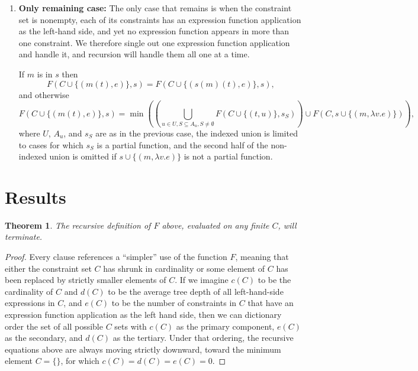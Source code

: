\documentclass{article}
\newtheorem{thm}{Theorem}
\begin{document}
\begin{enumerate}
        Let $U$ be the set of subexpressions of $e$, and for each $u\in U$, write $A_u$ to mean the set of addresses into $e$ at which $u$ appears.  Let $s_S$ be defined as in the previous case, but with $e$ instead of $e_1$.  Then
        \begin{multline*}
        	F(C\cup\{(m(t_1),e),(m(t_2),e)\},s) =	\\
                \min\left(\left(\bigcup_{u\in U,S\subseteq A_u,S\neq\emptyset}
                	F(C\cup\{(t_1,u),(t_2,u)\},s_S)\right)
                    	\cup F(C,s\cup\{(m,\lambda v.e)\})\right),
        \end{multline*}
        where the indexed union is limited to cases for which $s_S$ is a partial function, and the second half of the non-indexed union is omitted if $s\cup\{(m,\lambda v.e)\}$ is not a partial function.
\item	\label{case:otherwise}
		{\bf Only remaining case:}
		The only case that remains is when the constraint set is nonempty, each of its constraints has an expression function application as the left-hand side, and yet no expression function appears in more than one constraint.  We therefore single out one expression function application and handle it, and recursion will handle them all one at a time.
		
		If $m$ is in $s$ then
		$$	F(C\cup\{(m(t),e)\},s) = F(C\cup\{(s(m)(t),e)\},s),	$$
		and otherwise
		$$	F(C\cup\{(m(t),e)\},s) = 
				\min\left(\left(\bigcup_{u\in U,S\subseteq A_u,S\neq\emptyset}
					F(C\cup\{(t,u)\},s_S)\right)
						\cup F(C,s\cup\{(m,\lambda v.e)\})\right),	$$
		where $U$, $A_u$, and $s_S$ are as in the previous case, the indexed union is limited to cases for which $s_S$ is a partial function, and the second half of the non-indexed union is omitted if $s\cup\{(m,\lambda v.e)\}$ is not a partial function.
\end{enumerate}

\section{Results}%

\begin{thm}\label{T:terminates}
The recursive definition of $F$ above, evaluated on any finite $C$, will terminate.
\end{thm}
\begin{proof}
Every clause references a ``simpler'' use of the function $F$, meaning that either the constraint set $C$ has shrunk in cardinality or some element of $C$ has been replaced by strictly smaller elements of $C$.  If we imagine $c(C)$ to be the cardinality of $C$ and $d(C)$ to be the average tree depth of all left-hand-side expressions in $C$, and $e(C)$ to be the number of constraints in $C$ that have an expression function application as the left hand side, then we can dictionary order the set of all possible $C$ sets with $c(C)$ as the primary component, $e(C)$ as the secondary, and $d(C)$ as the tertiary.  Under that ordering, the recursive equations above are always moving strictly downward, toward the minimum element $C=\{\}$, for which $c(C)=d(C)=e(C)=0$.
\end{proof}
\end{document}
